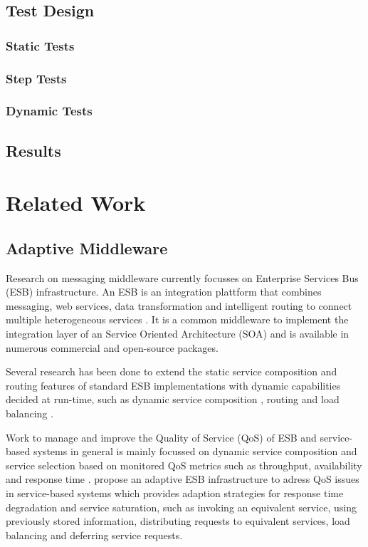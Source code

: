 \subsection{Test Design}

\subsubsection{Static Tests}

\subsubsection{Step Tests}

\subsubsection{Dynamic Tests}

\subsection{Results}

\section{Related Work}\label{sec:ch5_related_work}
\subsection{Adaptive Middleware}
Research on messaging middleware currently focusses on Enterprise Services Bus (ESB) infrastructure. An ESB is an integration plattform that combines messaging, web services, data transformation and intelligent routing to connect multiple heterogeneous services \citep{Chappell:2004jo}. It is a common middleware to implement the integration layer of an Service Oriented Architecture (SOA) and is available in numerous commercial and open-source packages.

Several research has been done to extend the static service composition and routing features of standard ESB implementations with dynamic capabilities decided at run-time, such as dynamic service composition \citep{Chang:2007aa}, routing \citep{Bai:2007aa} \citep{Wu:2008aa} \citep{Ziyaeva:2008aa} and load balancing \citep{Jongtaveesataporn:2010aa}.

Work to manage and improve the Quality of Service (QoS) of ESB and service-based systems in general is mainly focussed on dynamic service composition and service selection based on monitored QoS metrics such as throughput, availability and response time \citep{Calinescu:2011aa}. \cite{Gonzalez:2011} propose an adaptive ESB infrastructure to adress QoS issues in service-based systems which provides adaption strategies for response time degradation and service saturation, such as invoking an equivalent service, using previously stored information, distributing requests to equivalent services, load balancing and deferring service requests.

